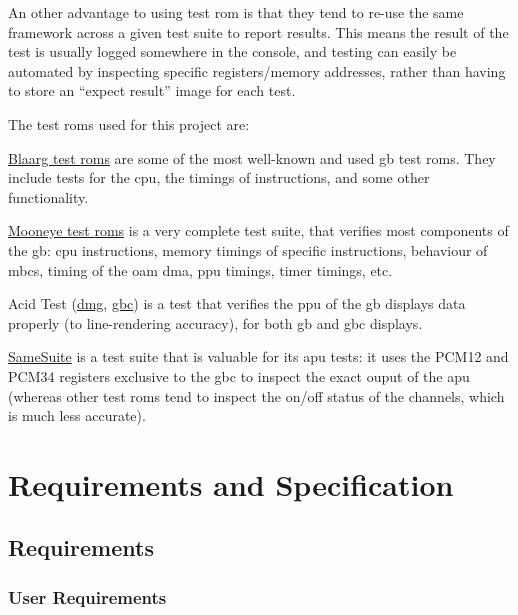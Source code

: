 \documentclass[11pt]{report}
\begin{document}
An other advantage to using test \gls{rom} is that they tend to re-use the same framework across a given test suite to report results. This means the result of the test is usually logged somewhere in the console, and testing can easily be automated by inspecting specific registers/memory addresses, rather than having to store an ``expect result'' image for each test.

The test \glspl{rom} used for this project are:

\begin{compactitem}
    \item \href{https://github.com/retrio/gb-test-roms/}{Blaarg test \glspl{rom}} are some of the most well-known and used \gls{gb} test \glspl{rom}. They include tests for the \gls{cpu}, the timings of instructions, and some other functionality.
    \item \href{https://github.com/Gekkio/mooneye-test-suite}{Mooneye test \glspl{rom}} is a very complete test suite, that verifies most components of the \gls{gb}: \gls{cpu} instructions, memory timings of specific instructions, behaviour of \glspl{mbc}, timing of the \gls{oam} \gls{dma}, \gls{ppu} timings, timer timings, etc.
    \item Acid Test (\href{https://github.com/mattcurrie/dmg-acid2}{\gls{dmg}}, \href{https://github.com/mattcurrie/cgb-acid2}{\gls{gbc}}) is a test that verifies the \gls{ppu} of the \gls{gb} displays data properly (to line-rendering accuracy), for both \glsdesc{gb} and \glsdesc{gbc} displays.
    \item \href{https://github.com/LIJI32/SameSuite/}{SameSuite} is a test suite that is valuable for its \gls{apu} tests: it uses the PCM12 and PCM34 registers exclusive to the \gls{gbc} to inspect the exact ouput of the \gls{apu} (whereas other test \glspl{rom} tend to inspect the on/off status of the channels, which is much less accurate).
\end{compactitem}

\chapter{Requirements and Specification}

\section{Requirements}

\subsection{User Requirements}
\end{document}
